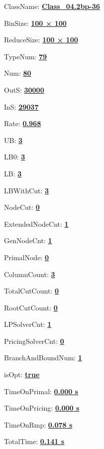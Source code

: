 \documentclass[11pt]{article}
\begin{document}
\pagestyle{empty}


ClassName: \underline{\textbf{Class_04.2bp-36}}
\par
BinSize: \underline{\textbf{100 × 100}}
\par
ReduceSize: \underline{\textbf{100 × 100}}
\par
TypeNum: \underline{\textbf{79}}
\par
Num: \underline{\textbf{80}}
\par
OutS: \underline{\textbf{30000}}
\par
InS: \underline{\textbf{29037}}
\par
Rate: \underline{\textbf{0.968}}
\par
UB: \underline{\textbf{3}}
\par
LB0: \underline{\textbf{3}}
\par
LB: \underline{\textbf{3}}
\par
LBWithCut: \underline{\textbf{3}}
\par
NodeCut: \underline{\textbf{0}}
\par
ExtendedNodeCnt: \underline{\textbf{1}}
\par
GenNodeCnt: \underline{\textbf{1}}
\par
PrimalNode: \underline{\textbf{0}}
\par
ColumnCount: \underline{\textbf{3}}
\par
TotalCutCount: \underline{\textbf{0}}
\par
RootCutCount: \underline{\textbf{0}}
\par
LPSolverCnt: \underline{\textbf{1}}
\par
PricingSolverCnt: \underline{\textbf{0}}
\par
BranchAndBoundNum: \underline{\textbf{1}}
\par
isOpt: \underline{\textbf{true}}
\par
TimeOnPrimal: \underline{\textbf{0.000 s}}
\par
TimeOnPricing: \underline{\textbf{0.000 s}}
\par
TimeOnRmp: \underline{\textbf{0.078 s}}
\par
TotalTime: \underline{\textbf{0.141 s}}
\par
\newpage
\end{document}
